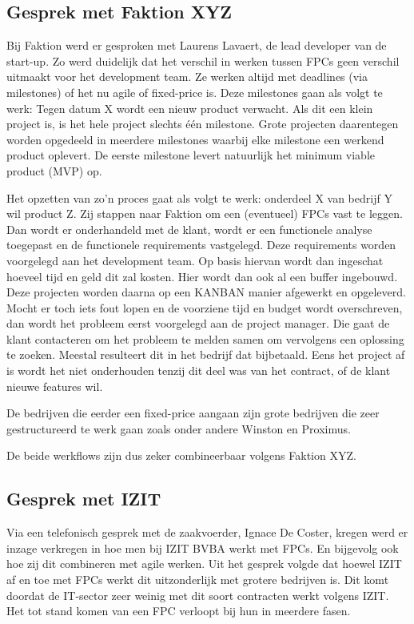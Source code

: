 \documentclass{hogent-article}
\begin{document}
    \subsection{Gesprek met Faktion XYZ}
    Bij Faktion werd er gesproken met Laurens Lavaert, de lead developer van de start-up. Zo werd duidelijk dat het verschil in werken tussen FPCs geen verschil uitmaakt voor het development team. Ze werken altijd met deadlines (via milestones) of het nu agile of fixed-price is. Deze milestones gaan als volgt te werk: Tegen datum X wordt een nieuw product verwacht. Als dit een klein project is, is het hele project slechts één milestone. Grote projecten daarentegen worden opgedeeld in meerdere milestones waarbij elke milestone een werkend product oplevert. De eerste milestone levert natuurlijk het minimum viable product (MVP) op.
    
    Het opzetten van zo'n proces gaat als volgt te werk: onderdeel X van bedrijf Y wil product Z. Zij stappen naar Faktion om een (eventueel) FPCs vast te leggen. Dan wordt er onderhandeld met de klant, wordt er een functionele analyse toegepast en de functionele requirements vastgelegd. Deze requirements worden voorgelegd aan het development team. Op basis hiervan wordt dan ingeschat hoeveel tijd en geld dit zal kosten. Hier wordt dan ook al een buffer ingebouwd. Deze projecten worden daarna op een KANBAN manier afgewerkt en opgeleverd. Mocht er toch iets fout lopen en de voorziene tijd en budget wordt overschreven, dan wordt het probleem eerst voorgelegd aan de project manager. Die gaat de klant contacteren om het probleem te melden samen om vervolgens een oplossing te zoeken. Meestal resulteert dit in het bedrijf dat bijbetaald. Eens het project af is wordt het niet onderhouden tenzij dit deel was van het contract, of de klant nieuwe features wil.
    
    De bedrijven die eerder een fixed-price aangaan zijn grote bedrijven die zeer gestructureerd te werk gaan zoals onder andere Winston en Proximus.
    
    De beide werkflows zijn dus zeker combineerbaar volgens Faktion XYZ.
    
    \subsection{Gesprek met IZIT}
    Via een telefonisch gesprek met de zaakvoerder, Ignace De Coster, kregen werd er inzage verkregen in hoe men bij IZIT BVBA werkt met FPCs. En bijgevolg ook hoe zij dit combineren met agile werken. Uit het gesprek volgde dat hoewel IZIT af en toe met FPCs werkt dit uitzonderlijk met grotere bedrijven is. Dit komt doordat de IT-sector zeer weinig met dit soort contracten werkt volgens IZIT. Het tot stand komen van een FPC verloopt bij hun in meerdere fasen.
    
\end{document}
